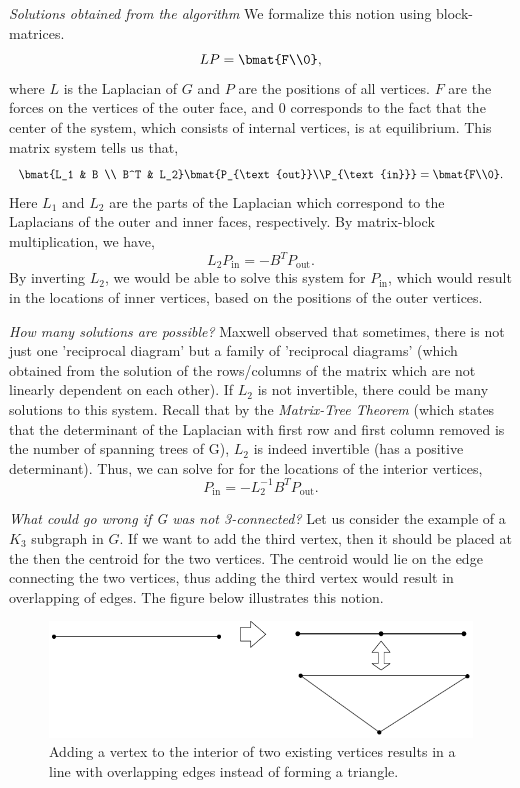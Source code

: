 \documentclass{article}
\begin{document}
  \noindent \textit{Solutions obtained from the algorithm}
  We formalize this notion using block-matrices. $$LP = \bmat{F\\0},$$ where $L$ is the Laplacian of $G$ and $P$ are the positions of all vertices. $F$ are the forces on the vertices of the outer face, and $0$ corresponds to the fact that the center of the system, which consists of internal vertices, is at equilibrium. This matrix system tells us that, $$\bmat{L_1 & B \\ B^T & L_2}\bmat{P_{\text{out}}\\P_{\text{in}}} = \bmat{F\\0}.$$ Here $L_1$ and $L_2$ are the parts of the Laplacian which correspond to the Laplacians of the outer and inner faces, respectively. By matrix-block multiplication, we have, $$L_2P_{\text{in}} = -B^TP_{\text{out}}.$$ By inverting $L_2$, we would be able to solve this system for $P_{\text{in}}$, which would result in the locations of inner vertices, based on the positions of the outer vertices.
  
  \noindent \textit{How many solutions are possible?}
  Maxwell observed that sometimes, there is not just one 'reciprocal diagram' but a family of 'reciprocal diagrams' (which obtained from the solution of the rows/columns of the matrix which are not linearly dependent on each other).
  If $L_2$ is not invertible, there could be many solutions to this system. Recall that by the \textit{Matrix-Tree Theorem} (which states that the determinant of the Laplacian with first row and first column removed is the number of spanning trees of G), $L_2$ is indeed invertible (has a positive determinant). Thus, we can solve for for the locations of the interior vertices, $$P_{\text{in}} = -L_2^{-1}B^T P_{\text{out}}.$$
  
  \textit{What could go wrong if G was not 3-connected?} Let us consider the example of a $K_3$ subgraph in $G$. If we want to add the third vertex, then it should be placed at the then the centroid for the two vertices. The centroid would lie on the edge connecting the two vertices, thus adding the third vertex would result in overlapping of edges. The figure below illustrates this notion.
  
  \medskip \noindent 
      \begin{figure}[H]
    \centering
    \includegraphics[scale=0.5]{Images/k3_centroid.png}
    \caption{Adding a vertex to the interior of two existing vertices results in a line with overlapping edges instead of forming a triangle.}
    \label{fig:my_label}
    \end{figure}
  
\end{document}
